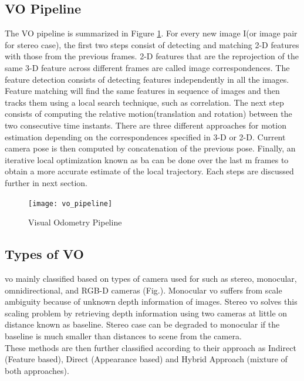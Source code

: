 \subsection{VO Pipeline}
The VO pipeline is summarized in Figure \ref{fig:flow}. For every new image I(or image pair for stereo case), the first two steps consist of detecting and matching 2-D features with those from the previous frames. 2-D features that are the reprojection of the same 3-D feature across different frames are called image correspondences. The feature detection consists of detecting features independently in all the images. Feature matching will find the same features in sequence of images and then tracks them using a local search technique, such as correlation. The next step consists of computing the relative motion(translation and rotation) between the two consecutive time instants. There are three different approaches for motion estimation depending on the correspondences specified in 3-D or 2-D. Current camera pose is then computed by concatenation of the previous pose. Finally, an iterative local optimization known as \acrshort{ba} can be done over the last m frames to obtain a more accurate estimate of the local trajectory. Each steps are discussed further in next section.

\begin{figure}[h]
	\centering
	\texttt{[image: vo\_pipeline]}
	\caption{Visual Odometry Pipeline}
	\label{fig:flow}
\end{figure}
\subsection{Types of VO}
\label{section:vo_types}
\acrshort{vo} mainly classified based on types of camera used for such as stereo, monocular, omnidirectional, and RGB-D cameras (Fig.). Monocular \acrshort{vo} suffers from scale ambiguity because of unknown depth information of images. Stereo \acrshort{vo} solves this scaling problem by retrieving depth information using two cameras at little on distance known as baseline. Stereo case can be degraded to monocular if the baseline is much smaller than distances to scene from the camera.\\
\newline
These methods are then further classified according to their approach as Indirect (Feature based), Direct (Appearance based) and Hybrid Approach (mixture of both approaches).

